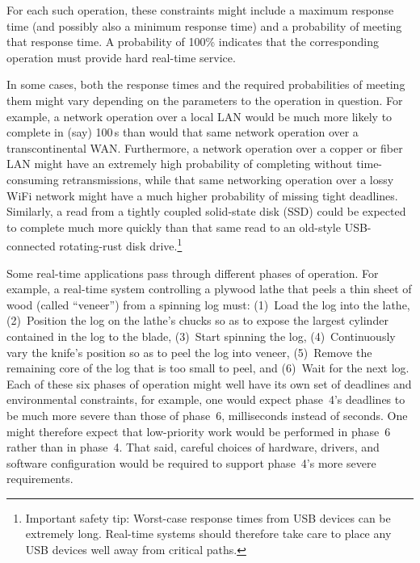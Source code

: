 For each such operation, these constraints might include a maximum
response time (and possibly also a minimum response time) and a
probability of meeting that response time.
A probability of 100\% indicates that the corresponding operation
must provide hard real-time service.

In some cases, both the response times and the required probabilities of
meeting them might vary depending on the parameters to the operation in
question.
For example, a network operation over a local LAN would be much more likely
to complete in (say) 100\,\micro s than would that same network operation
over a transcontinental WAN.
Furthermore, a network operation over a copper or fiber
LAN might have an extremely
high probability of completing without time-consuming retransmissions,
while that same networking operation over a lossy WiFi network might
have a much higher probability of missing tight deadlines.
Similarly, a read from a tightly coupled solid-state disk (SSD) could be
expected to complete much more quickly than that same read to an old-style
USB-connected rotating-rust disk drive.\footnote{
	Important safety tip:  Worst-case response times from USB devices
	can be extremely long.
	Real-time systems should therefore take care to place any USB
	devices well away from critical paths.}

Some real-time applications pass through different phases of operation.
For example, a real-time system controlling a plywood lathe that peels
a thin sheet of wood (called ``veneer'') from a spinning log must:
(1)~Load the log into the lathe,
(2)~Position the log on the lathe's chucks so as to expose the largest
cylinder contained in the log to the blade,
(3)~Start spinning the log,
(4)~Continuously vary the knife's position so as to peel the log into veneer,
(5)~Remove the remaining core of the log that is too small to peel, and
(6)~Wait for the next log.
Each of these six phases of operation might well have its own set of
deadlines and environmental constraints,
for example, one would expect phase~4's deadlines to be much more severe
than those of phase~6, milliseconds instead of seconds.
One might therefore expect that low-priority work would be performed in
phase~6 rather than in phase~4.
That said, careful choices of hardware, drivers, and software configuration
would be required to support phase~4's more severe requirements.


